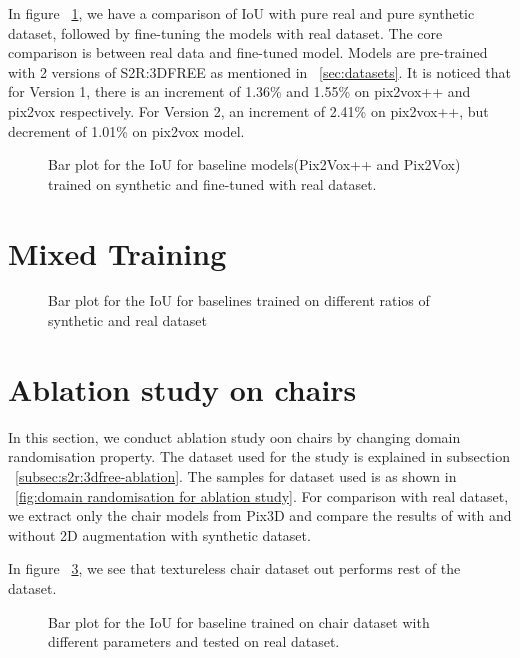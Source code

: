 In figure ~\ref{fig:finetuning1}, we have a comparison of IoU with pure real and pure synthetic dataset, followed by fine-tuning the models with real dataset.
The core comparison is between real data and fine-tuned model.
Models are pre-trained with 2 versions of S2R:3DFREE as mentioned in ~\ref{sec:datasets}.
It is noticed that for Version 1, there is an increment of 1.36\% and 1.55\% on pix2vox++ and pix2vox respectively.
For Version 2, an increment of 2.41\% on pix2vox++, but decrement of 1.01\% on pix2vox model.

\begin{figure}
    \centering
    \resizebox{\textwidth}{!}{}
    \caption{Bar plot for the IoU for baseline models(Pix2Vox++ and Pix2Vox) trained on synthetic and fine-tuned with real dataset. }
    \label{fig:finetuning1}
\end{figure}

\section{Mixed Training}\label{sec:mixed-training}


\begin{figure}
    \centering
    \resizebox{\textwidth}{!}{}
    \caption{Bar plot for the IoU for baselines trained on different ratios of synthetic and real dataset}
    \label{fig:mixed1}
\end{figure}

\section{Ablation study on chairs}\label{sec:ablation-study-on-chairs}
In this section, we conduct ablation study oon chairs by changing domain randomisation property.
The dataset used for the study is explained in subsection ~\ref{subsec:s2r:3dfree-ablation}.
The samples for dataset used is as shown in ~\ref{fig:domain randomisation for ablation study}.
For comparison with real dataset, we extract only the chair models from Pix3D and compare the results of with and without 2D augmentation with synthetic dataset.

In figure ~\ref{fig:ablation1}, we see that textureless chair dataset out performs rest of the dataset.

\begin{figure}
    \centering
    \resizebox{\textwidth}{!}{}
    \caption{Bar plot for the IoU for baseline trained on chair dataset with different parameters and tested on real dataset.}
    \label{fig:ablation1}
\end{figure}



